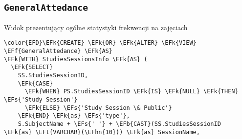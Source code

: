 \documentclass[11pt]{article}
\newcommand{\EFs}[1]{\textcolor{EFs}{#1}} %
\newcommand{\EFk}[1]{\textcolor{EFk}{\textbf{#1}}} %
\newcommand{\EFb}[1]{\textcolor{EFb}{\textbf{#1}}} %
\newcommand{\EFf}[1]{\textcolor{EFf}{#1}} %
\newcommand{\EFt}[1]{\textcolor{EFt}{\textbf{#1}}} %
\newcommand{\EFhn}[1]{\textcolor{EFhn}{#1}} %
\begin{document}
\subsection{\texttt{GeneralAttedance}}
\label{sec:orgc4eec46}
Widok prezentujący ogólne statystyki frekwencji na zajęciach
\begin{Code}
\begin{Verbatim}
\color{EFD}\EFk{CREATE} \EFk{OR} \EFk{ALTER} \EFk{VIEW} \EFf{GeneralAttedance} \EFk{AS}
\EFk{WITH} StudiesSessionsInfo \EFk{AS} (
  \EFk{SELECT} 
    SS.StudiesSessionID, 
    \EFk{CASE}
      \EFk{WHEN} PS.StudiesSessionID \EFk{IS} \EFk{NULL} \EFk{THEN} \EFs{'Study Session'}
      \EFk{ELSE} \EFs{'Study Session \& Public'}
    \EFk{END} \EFk{as} \EFs{'type'},
    S.SubjectName + \EFs{' '} + \EFb{CAST}(SS.StudiesSessionID \EFk{as} \EFt{VARCHAR}(\EFhn{10})) \EFk{as} SessionName,


\end{Verbatim}
\end{Code}
\end{document}
